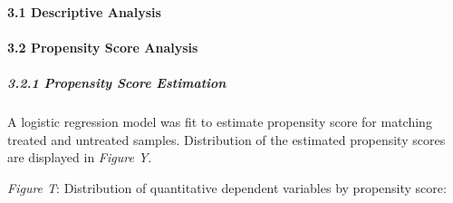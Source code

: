 \documentclass[]{article}
\let\oldparagraph\paragraph
\renewcommand{\paragraph}[1]{\oldparagraph{#1}\mbox{}}
\let\oldsubparagraph\subparagraph
\renewcommand{\subparagraph}[1]{\oldsubparagraph{#1}\mbox{}}
\begin{document}
\hypertarget{descriptive-analysis-1}{%
\paragraph{3.1 Descriptive Analysis}\label{descriptive-analysis-1}}

\hypertarget{propensity-score-analysis-1}{%
\paragraph{3.2 Propensity Score Analysis}\label{propensity-score-analysis-1}}

\hypertarget{propensity-score-estimation-1}{%
\subparagraph{3.2.1 Propensity Score Estimation}\label{propensity-score-estimation-1}}

A logistic regression model was fit to estimate propensity score for matching treated and untreated samples. Distribution of the estimated propensity scores are displayed in \emph{Figure Y}.

\emph{Figure T}: Distribution of quantitative dependent variables by propensity score:
\end{document}
